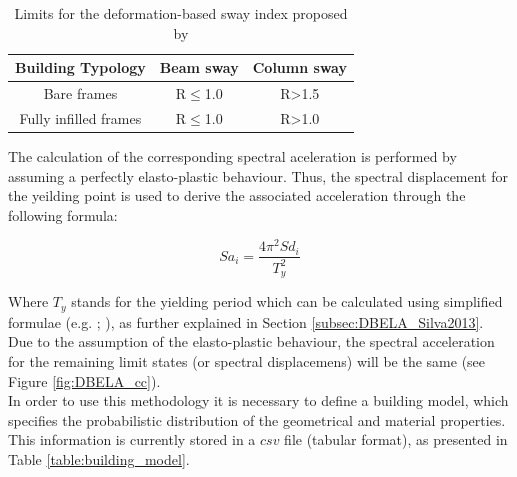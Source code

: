 \begin {table}[htb]
\caption{Limits for the deformation-based sway index proposed by \cite{AboElEzz2008}} 
\label{table:AboElEzz2008} 
\begin{center}
  \begin{tabular}{ | c | c | c |}
  \hline
    Building Typology & Beam sway & Column sway  \\ \hline
    Bare frames & R$\leq$1.0 & R>1.5 \\ \hline
    Fully infilled frames & R$\leq$1.0 & R>1.0 \\ \hline
  \end{tabular}
\end{center}
\end{table}

The calculation of the corresponding spectral aceleration is performed by assuming a perfectly elasto-plastic behaviour. Thus, the spectral displacement for the yeilding point is used to derive the associated acceleration through the following formula:

\begin{equation}
Sa_i = \frac{4\pi^2Sd_i}{T_y^2}
\end{equation}

Where $T_y$ stands for the yielding period which can be calculated using simplified formulae (e.g. \cite{CrowleyPinho2004}; \cite{CrowleyPinho2006}), as further explained in Section \ref{subsec:DBELA_Silva2013}. Due to the assumption of the elasto-plastic behaviour, the spectral acceleration for the remaining limit states (or spectral displacemens) will be the same (see Figure \ref{fig:DBELA_cc}). \\ 

In order to use this methodology it is necessary to define a building model, which specifies the probabilistic distribution of the geometrical and material properties. This information is currently stored in a $csv$ file (tabular format), as presented in Table \ref{table:building_model}.
 

